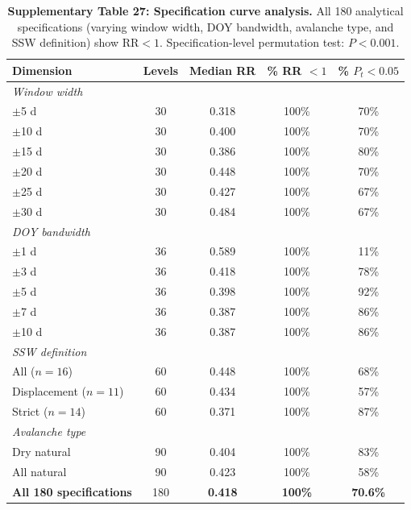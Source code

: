 \documentclass[11pt,letterpaper]{article}
\begin{document}
\begin{table}[!ht]
\centering
\caption{\textbf{Supplementary Table 27: Specification curve analysis.}
All 180 analytical specifications (varying window width, DOY bandwidth, avalanche type, and SSW definition) show $\mathrm{RR} < 1$. Specification-level permutation test: $P < 0.001$.}
\label{tab:spec_curve}
\small
\begin{tabular}{lcccc}
\toprule
Dimension & Levels & Median RR & \% RR $< 1$ & \% $P_t < 0.05$ \\
\midrule
\multicolumn{5}{l}{\textit{Window width}} \\
$\pm$5 d & 30 & 0.318 & 100\% & 70\% \\
$\pm$10 d & 30 & 0.400 & 100\% & 70\% \\
$\pm$15 d & 30 & 0.386 & 100\% & 80\% \\
$\pm$20 d & 30 & 0.448 & 100\% & 70\% \\
$\pm$25 d & 30 & 0.427 & 100\% & 67\% \\
$\pm$30 d & 30 & 0.484 & 100\% & 67\% \\
\midrule
\multicolumn{5}{l}{\textit{DOY bandwidth}} \\
$\pm$1 d & 36 & 0.589 & 100\% & 11\% \\
$\pm$3 d & 36 & 0.418 & 100\% & 78\% \\
$\pm$5 d & 36 & 0.398 & 100\% & 92\% \\
$\pm$7 d & 36 & 0.387 & 100\% & 86\% \\
$\pm$10 d & 36 & 0.387 & 100\% & 86\% \\
\midrule
\multicolumn{5}{l}{\textit{SSW definition}} \\
All ($n = 16$) & 60 & 0.448 & 100\% & 68\% \\
Displacement ($n = 11$) & 60 & 0.434 & 100\% & 57\% \\
Strict ($n = 14$) & 60 & 0.371 & 100\% & 87\% \\
\midrule
\multicolumn{5}{l}{\textit{Avalanche type}} \\
Dry natural & 90 & 0.404 & 100\% & 83\% \\
All natural & 90 & 0.423 & 100\% & 58\% \\
\midrule
\textbf{All 180 specifications} & 180 & \textbf{0.418} & \textbf{100\%} & \textbf{70.6\%} \\
\bottomrule
\end{tabular}
\end{table}
\end{document}
